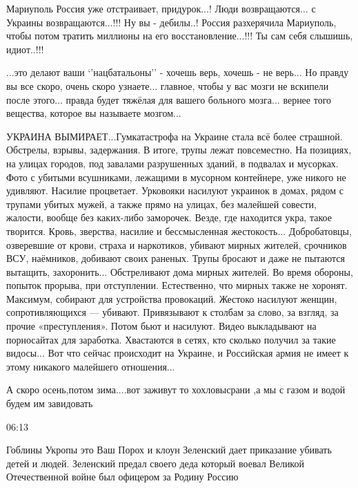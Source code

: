 
Мариуполь Россия уже отстраивает, придурок...! Люди возвращаются... с Украины
возвращаются...!!! Ну вы - дебилы..! Россия разхерячила Мариуполь, чтобы потом
тратить миллионы на его восстановление...!!! Ты сам себя слышишь, идиот..!!!


...это делают ваши ‘’нацбатальоны’’ - хочешь верь, хочешь - не верь... Но
правду вы все скоро, очень скоро узнаете... главное, чтобы у вас мозги не
вскипели после этого... правда будет тяжёлая для вашего больного мозга...
вернее того вещества, которое вы называете мозгом...🤯🤯🤯🔥


УКРАИНА ВЫМИРАЕТ...Гумкатастрофа на Украине стала всё более страшной. Обстрелы,
взрывы, задержания. В итоге, трупы лежат повсеместно. На позициях, на улицах
городов, под завалами разрушенных зданий, в подвалах и мусорках. Фото с убитыми
всушниками, лежащими в мусорном контейнере, уже никого не удивляют. Насилие
процветает. Урковояки насилуют украинок в домах, рядом с трупами убитых мужей,
а также прямо на улицах, без малейшей совести, жалости, вообще без каких-либо
заморочек. Везде, где находится укра, такое творится. Кровь, зверства, насилие
и бессмысленная жестокость... Добробатовцы, озверевшие от крови, страха и
наркотиков, убивают мирных жителей, срочников ВСУ, наёмников, добивают своих
раненых. Трупы бросают и даже не пытаются вытащить, захоронить... Обстреливают
дома мирных жителей. Во время обороны, попыток прорыва, при отступлении.
Естественно, что мирных также не хоронят. Максимум, собирают для устройства
провокаций. Жестоко насилуют женщин, сопротивляющихся — убивают. Привязывают к
столбам за слово, за взгляд, за прочие «преступления». Потом бьют и насилуют.
Видео выкладывают на порносайтах для заработка. Хвастаются в сетях, кто сколько
получил за такие видосы... Вот что сейчас происходит на Украине, и Российская
армия не имеет к этому никакого малейшего отношения...


А скоро осень,потом зима....вот заживут то хохловысрани ,а мы с газом и водой
будем им завидовать 🤗🤣🤣🤣🤣🤣😋

06:13

Гоблины Укропы это Ваш Порох и клоун Зеленский дает приказание убивать детей и
людей. Зеленский предал своего деда который воевал Великой Отечественной войне
был офицером за Родину Россию

